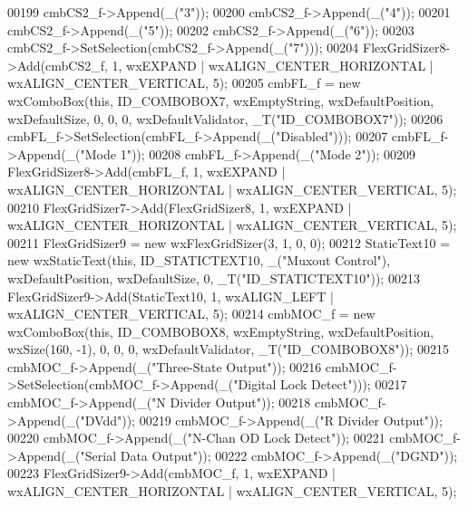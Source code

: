 \begin{DoxyCode}
00199     cmbCS2\_f->Append(\_(\textcolor{stringliteral}{"3"}));
00200     cmbCS2\_f->Append(\_(\textcolor{stringliteral}{"4"}));
00201     cmbCS2\_f->Append(\_(\textcolor{stringliteral}{"5"}));
00202     cmbCS2\_f->Append(\_(\textcolor{stringliteral}{"6"}));
00203     cmbCS2\_f->SetSelection(cmbCS2\_f->Append(\_(\textcolor{stringliteral}{"7"})));
00204     FlexGridSizer8->Add(cmbCS2\_f, 1, wxEXPAND | wxALIGN\_CENTER\_HORIZONTAL | wxALIGN\_CENTER\_VERTICAL, 5);
00205     cmbFL\_f = \textcolor{keyword}{new} wxComboBox(\textcolor{keyword}{this}, ID\_COMBOBOX7, wxEmptyString, wxDefaultPosition, wxDefaultSize, 0, 0, 0, 
      wxDefaultValidator, \_T(\textcolor{stringliteral}{"ID\_COMBOBOX7"}));
00206     cmbFL\_f->SetSelection(cmbFL\_f->Append(\_(\textcolor{stringliteral}{"Disabled"})));
00207     cmbFL\_f->Append(\_(\textcolor{stringliteral}{"Mode 1"}));
00208     cmbFL\_f->Append(\_(\textcolor{stringliteral}{"Mode 2"}));
00209     FlexGridSizer8->Add(cmbFL\_f, 1, wxEXPAND | wxALIGN\_CENTER\_HORIZONTAL | wxALIGN\_CENTER\_VERTICAL, 5);
00210     FlexGridSizer7->Add(FlexGridSizer8, 1, wxEXPAND | wxALIGN\_CENTER\_HORIZONTAL | wxALIGN\_CENTER\_VERTICAL, 
      5);
00211     FlexGridSizer9 = \textcolor{keyword}{new} wxFlexGridSizer(3, 1, 0, 0);
00212     StaticText10 = \textcolor{keyword}{new} wxStaticText(\textcolor{keyword}{this}, ID\_STATICTEXT10, \_(\textcolor{stringliteral}{"Muxout Control"}), wxDefaultPosition, 
      wxDefaultSize, 0, \_T(\textcolor{stringliteral}{"ID\_STATICTEXT10"}));
00213     FlexGridSizer9->Add(StaticText10, 1, wxALIGN\_LEFT | wxALIGN\_CENTER\_VERTICAL, 5);
00214     cmbMOC\_f = \textcolor{keyword}{new} wxComboBox(\textcolor{keyword}{this}, ID\_COMBOBOX8, wxEmptyString, wxDefaultPosition, wxSize(160, -1), 0, 0, 
      0, wxDefaultValidator, \_T(\textcolor{stringliteral}{"ID\_COMBOBOX8"}));
00215     cmbMOC\_f->Append(\_(\textcolor{stringliteral}{"Three-State Output"}));
00216     cmbMOC\_f->SetSelection(cmbMOC\_f->Append(\_(\textcolor{stringliteral}{"Digital Lock Detect"})));
00217     cmbMOC\_f->Append(\_(\textcolor{stringliteral}{"N Divider Output"}));
00218     cmbMOC\_f->Append(\_(\textcolor{stringliteral}{"DVdd"}));
00219     cmbMOC\_f->Append(\_(\textcolor{stringliteral}{"R Divider Output"}));
00220     cmbMOC\_f->Append(\_(\textcolor{stringliteral}{"N-Chan OD Lock Detect"}));
00221     cmbMOC\_f->Append(\_(\textcolor{stringliteral}{"Serial Data Output"}));
00222     cmbMOC\_f->Append(\_(\textcolor{stringliteral}{"DGND"}));
00223     FlexGridSizer9->Add(cmbMOC\_f, 1, wxEXPAND | wxALIGN\_CENTER\_HORIZONTAL | wxALIGN\_CENTER\_VERTICAL, 5);

\end{DoxyCode}

